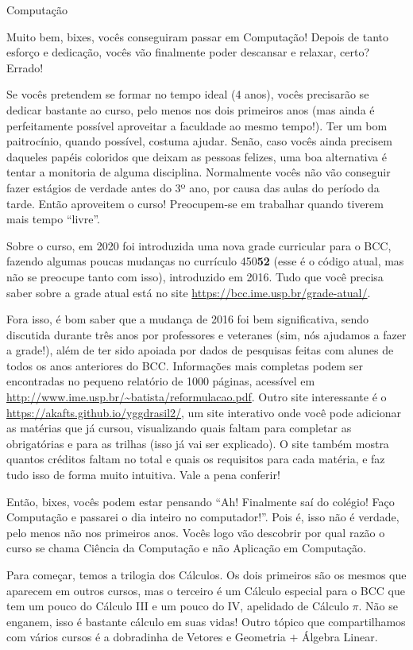 \begin{subsecao}{Computação}

Muito bem, bixes, vocês conseguiram passar em Computação! Depois de tanto
esforço e dedicação, vocês vão finalmente poder descansar e relaxar, certo?
Errado!

Se vocês pretendem se formar no tempo ideal (4 anos), vocês precisarão se
dedicar bastante ao curso, pelo menos nos dois primeiros anos (mas ainda é
perfeitamente possível aproveitar a faculdade ao mesmo tempo!). Ter um bom
paitrocínio, quando possível, costuma ajudar. Senão, caso vocês ainda precisem
daqueles papéis coloridos que deixam as pessoas felizes, uma boa alternativa é
tentar a monitoria de alguma disciplina. Normalmente vocês não vão conseguir 
fazer estágios de verdade antes do 3º ano, por causa das aulas do período da tarde. 
Então aproveitem o curso! Preocupem-se em trabalhar quando tiverem mais tempo ``livre''.

Sobre o curso, em 2020 foi introduzida uma nova grade curricular para o BCC,
fazendo algumas poucas mudanças no currículo 450\textbf{52} (esse é o código
atual, mas não se preocupe tanto com isso), introduzido em 2016. Tudo que você
precisa saber sobre a grade atual está no site \url{https://bcc.ime.usp.br/grade-atual/}.

Fora isso, é bom saber que a mudança de 2016 foi bem significativa, sendo
discutida durante três anos por professores e veteranes (sim, nós ajudamos a
fazer a grade!), além de ter sido apoiada por dados de pesquisas feitas com
alunes de todos os anos anteriores do BCC. Informações mais completas podem
ser encontradas no pequeno relatório de 1000 páginas, acessível em
\url{http://www.ime.usp.br/~batista/reformulacao.pdf}. Outro site interessante é o 
\url{https://akafts.github.io/yggdrasil2/}, um
site interativo onde você pode adicionar as matérias que já cursou,
visualizando quais faltam para completar as obrigatórias e para as trilhas
(isso já vai ser explicado). O site também mostra quantos créditos faltam no
total e quais os requisitos para cada matéria, e faz tudo isso de forma muito
intuitiva. Vale a pena conferir!

Então, bixes, vocês podem estar pensando ``Ah! Finalmente saí do colégio! Faço
Computação e passarei o dia inteiro no computador!''. Pois é, isso não é
verdade, pelo menos não nos primeiros anos. Vocês logo vão descobrir por qual
razão o curso se chama Ciência da Computação e não Aplicação em Computação.

Para começar, temos a trilogia dos Cálculos. Os dois primeiros são os mesmos
que aparecem em outros cursos, mas o terceiro é um Cálculo especial para o BCC
que tem um pouco do Cálculo III e um pouco do IV, apelidado de Cálculo $\pi$.
Não se enganem, isso é bastante cálculo em suas vidas! Outro tópico que
compartilhamos com vários cursos é a dobradinha de Vetores e Geometria $+$
Álgebra Linear. 


\end{subsecao}
